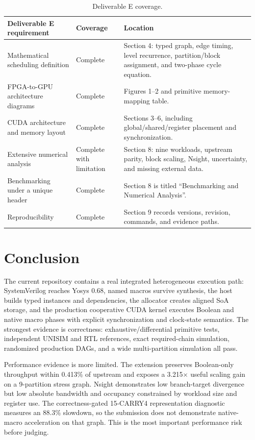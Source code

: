 \documentclass[11pt,a4paper]{article}
\begin{document}
\begin{table}[H]
\centering
\caption{Deliverable E coverage.}
\begin{tabularx}{\textwidth}{P{58mm} C{24mm} Y}
\toprule
Deliverable E requirement & Coverage & Location \\
\midrule
Mathematical scheduling definition & Complete & Section 4: typed graph, edge timing, level recurrence, partition/block assignment, and two-phase cycle equation. \\
FPGA-to-GPU architecture diagrams & Complete & Figures 1--2 and primitive memory-mapping table. \\
CUDA architecture and memory layout & Complete & Sections 3--6, including global/shared/register placement and synchronization. \\
Extensive numerical analysis & Complete with limitation & Section 8: nine workloads, upstream parity, block scaling, Nsight, uncertainty, and missing external data. \\
Benchmarking under a unique header & Complete & Section 8 is titled ``Benchmarking and Numerical Analysis''. \\
Reproducibility & Complete & Section 9 records versions, revision, commands, and evidence paths. \\
\bottomrule
\end{tabularx}
\end{table}

\section{Conclusion}

The current repository contains a real integrated heterogeneous execution path:
SystemVerilog reaches Yosys 0.68, named macros survive synthesis, the host builds
typed instances and dependencies, the allocator creates aligned SoA storage, and
the production cooperative CUDA kernel executes Boolean and native macro phases
with explicit synchronization and clock-state semantics.  The strongest evidence
is correctness: exhaustive/differential primitive tests, independent UNISIM and
RTL references, exact required-chain simulation, randomized production DAGs, and
a wide multi-partition simulation all pass.

Performance evidence is more limited.  The extension preserves Boolean-only
throughput within 0.413\% of upstream and exposes a 3.215$\times$ useful scaling
gain on a 9-partition stress graph.  Nsight demonstrates low branch-target
divergence but low absolute bandwidth and occupancy constrained by workload size
and register use.  The correctness-gated 15-CARRY4 representation diagnostic
measures an 88.3\% slowdown, so the submission does not demonstrate native-macro
acceleration on that graph.  This is the most important performance risk before
judging.
\end{document}
